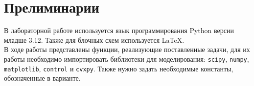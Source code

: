 \documentclass[a4paper,16pt]{article}
\begin{document}
\thispagestyle{firstpagestyle} 

\clearpage
\begingroup
\pagestyle{empty}       %
\tableofcontents
\thispagestyle{empty}   %
\endgroup
\clearpage
\setcounter{page}{1}
\pagestyle{style}

\section*{Прелиминарии}
\begin{center}
        \begin{minipage}{0.85\textwidth}
    \begin{centerblueblock}
        В лабораторной работе используется язык программирования Python версии младше 3.12. Также для блочных схем используется \LaTeX. \\В ходе работы представлены функции, реализующие поставленные задачи, для их работы необходимо импортировать библиотеки для моделирования: \texttt{scipy}, \texttt{numpy}, \texttt{matplotlib}, \texttt{control} и \texttt{cvxpy}. Также нужно задать необходимые константы, обозначенные в варианте.
\end{centerblueblock}
    \end{minipage}
\end{center}

\end{document}
